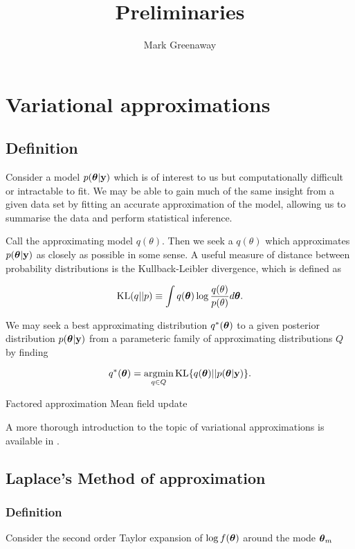 \documentclass{article}[12pt]
\title{Preliminaries}
\author{Mark Greenaway}
\begin{document}
\setlength{\parindent}{0pt}
\maketitle

\section{Variational approximations}

\subsection{Definition}

Consider a model $p({\boldsymbol \theta}|{\bf y})$ which is of interest to us but computationally difficult or intractable to 
fit. We may be able to gain much of the same insight from a given data set by fitting an accurate approximation 
of the model, allowing us to summarise the data and perform statistical inference.

Call the approximating model $q(\theta)$. Then we seek a $q(\theta)$ which approximates $p({\boldsymbol \theta}|{\bf y})$
as closely as possible in some sense. A useful measure of distance between probability distributions is the
Kullback-Leibler divergence, which is defined as

$$
\text{KL}(q || p) \equiv \int q({\boldsymbol \theta}) \log{\frac{q(\theta)}{p(\theta)}} d {\boldsymbol \theta}.
$$

We may seek a best approximating distribution $q^*({\boldsymbol \theta})$ to a given posterior distribution
$p({\boldsymbol \theta}|{\bf y})$ from a parameteric family of approximating distributions $Q$ by finding

$$
q^*(\vtheta) = \argmin_{q \in Q} \KL \{ {q(\vtheta) || p(\vtheta|\vy)} \}.
$$

Factored approximation
Mean field update

A more thorough introduction to the topic of variational approximations is available in \cite{ormerod10}.

\subsection{Laplace's Method of approximation}

\subsubsection{Definition}

Consider the second order Taylor expansion of $\log f({\boldsymbol \theta})$ around the mode ${\boldsymbol \theta}_m$
\end{document}

